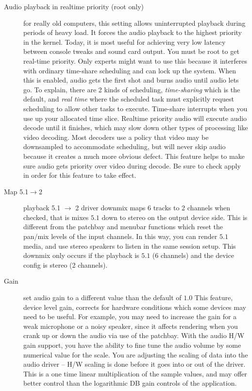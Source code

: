 \begin{description}
    \item[Audio playback in realtime priority (root only)] for really old computers, this setting allows uninterrupted playback during periods of heavy load. It forces the audio playback to the highest priority in the kernel. Today, it is most useful for achieving very low latency between console tweaks and sound card output. You must be root to get real-time priority. Only experts might want to use this because it interferes with ordinary time-share scheduling and can lock up the system.  When this is enabled, audio gets the first shot and burns audio until audio lets go. To explain, there are 2 kinds of scheduling, \textit{time-sharing} which is the default, and \textit{real time} where the scheduled task must explicitly request scheduling to allow other tasks to execute.  Time-share interrupts when you use up your allocated time slice.  Realtime priority audio will execute audio decode until it finishes, which may slow down other types of processing like video decoding.  Most decoders use a policy that video may be downsampled to accommodate scheduling, but will never skip audio because it creates a much more obvious defect.  This feature helps to make sure audio gets priority over video during decode. Be sure to check apply in order for this feature to take effect.
    \item[Map 5.1$\rightarrow$2]  playback 5.1 $\rightarrow$ 2 driver downmix maps 6 tracks to 2 channels when checked, that is mixes $5.1$ down to stereo on the output device side.  This is different from the patchbay and menubar functions which reset the pan/mix levels of the input channels.  In this way, you can render $5.1$ media, and use stereo speakers to listen in the same session setup.  This downmix only occurs if the playback is $5.1$ (6 channels) and the device config is stereo (2 channels).
    \item[Gain]  set audio gain to a different value than the default of $1.0$ This feature, device level gain, corrects for hardware conditions which some devices may need to be useful.  For example, you may need to increase the gain for a weak microphone or a noisy speaker, since it affects rendering when you crank up or down the audio via use of the patchbay.  With the audio H/W gain support, you have the ability to fine tune the audio volume by some numerical value for the scale.  You are adjusting the scaling of data into the audio driver -- H/W scaling is done before it goes into or out of the driver.  This is a one time linear multiplication of the sample values, and may offer better control than the logarithmic DB gain controls of the application.

\end{description}
